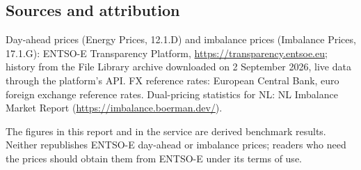 \documentclass[11pt,a4paper]{article}
\begin{document}
\subsection{Sources and attribution}

Day-ahead prices (Energy Prices, 12.1.D) and imbalance prices (Imbalance Prices, 17.1.G): ENTSO-E Transparency Platform, \url{https://transparency.entsoe.eu}; history from the File Library archive downloaded on 2 September 2026, live data through the platform's API. FX reference rates: European Central Bank, euro foreign exchange reference rates. Dual-pricing statistics for NL: NL Imbalance Market Report (\url{https://imbalance.boerman.dev/}).

The figures in this report and in the service are derived benchmark results. Neither republishes ENTSO-E day-ahead or imbalance prices; readers who need the prices should obtain them from ENTSO-E under its terms of use.
\end{document}
